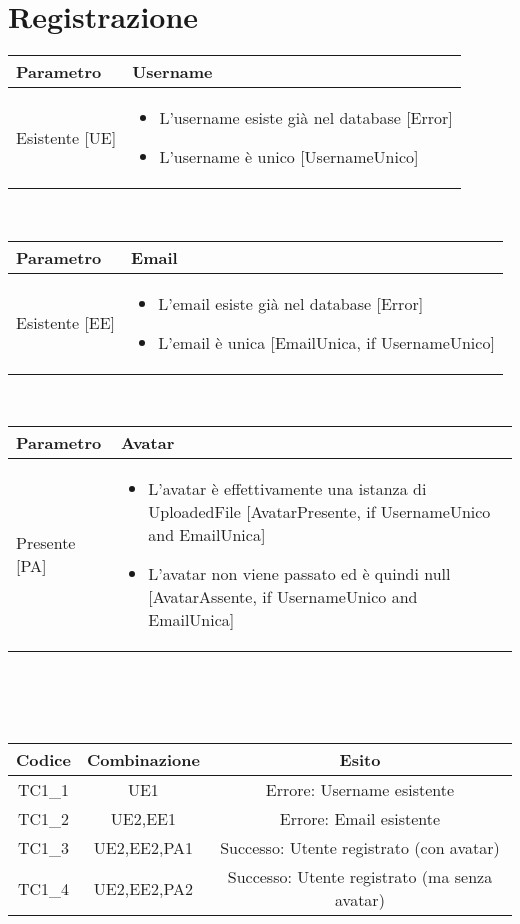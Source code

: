 \section{Registrazione}

\begin{tabular}{|| l | p{25em} ||} 
	\hline
	Parametro & Username\\
	\hline
	Esistente [UE] & \begin{itemize}
	\item L'username esiste già nel database [Error]
	\item L'username è unico [UsernameUnico] 
	\end{itemize}\\
	\hline
\end{tabular}
\\
\begin{tabular}{|| l | p{25em} ||} 
	\hline
	Parametro & Email\\
	\hline
	Esistente [EE] & \begin{itemize}
	\item L'email esiste già nel database [Error]
	\item L'email è unica [EmailUnica, if UsernameUnico] 
	\end{itemize}\\
	\hline
\end{tabular}
\\
\begin{tabular}{|| l | p{25em} ||} 
	\hline
	Parametro & Avatar\\
	\hline
	Presente [PA] & \begin{itemize}
	\item L'avatar è effettivamente una istanza di UploadedFile [AvatarPresente, if UsernameUnico and EmailUnica]
	\item L'avatar non viene passato ed è quindi null [AvatarAssente, if UsernameUnico and EmailUnica]
	\end{itemize}\\
	\hline
\end{tabular}
\\\\\\
\begin{tabular}{|| c | c | c ||}
	\hline
	Codice & Combinazione & Esito\\
	\hline
	TC1\_1 & UE1 & Errore: Username esistente \\
	\hline
	TC1\_2 & UE2,EE1 & Errore: Email esistente \\
	\hline
	TC1\_3 & UE2,EE2,PA1 & Successo: Utente registrato (con avatar) \\
	\hline
	TC1\_4 & UE2,EE2,PA2 & Successo: Utente registrato (ma senza avatar) \\
	\hline
\end{tabular}


